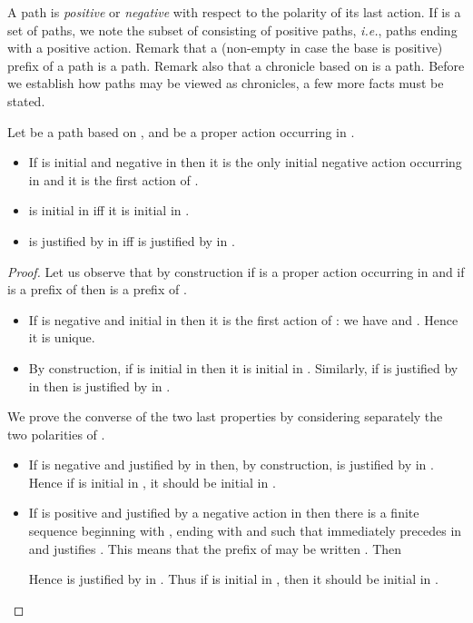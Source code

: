 \documentclass{LMCS}
\def\ie{{\em i.e.}}
\begin{document}
 

A path is {\em positive} or {\em negative} with respect to the polarity of its last action. If  is a set of paths, we note  the subset of  consisting of positive paths, \ie, paths ending with a positive action.
Remark that a (non-empty in case the base is positive) prefix of a path is a path.
Remark also that a chronicle based on  is a path.
Before we establish how paths may be viewed as chronicles, a few more facts must be stated.

 \begin{lem}\label{projection}
Let  be a path based on , and  be a proper action occurring in . 
  \begin{itemize}
  \item If  is initial and negative in  then it is the only initial negative action occurring in  and it is the first action of .
  \item  is initial in   iff it is  initial in .
  \item  is justified by  in  iff   is justified by  in .
  \end{itemize}
 \end{lem}

\begin{proof}
Let us observe that by construction if  is a proper action occurring in  and if  is a prefix of  then  is a prefix of .
\begin{itemize}
\item If   is negative and initial in  then it is the first action of : we have  and . Hence it is unique.
\item By construction, if  is initial in  then it is initial in . 
Similarly, if  is justified by  in  then   is justified by  in .
\end{itemize}
We prove the converse of the two last properties by considering separately the two polarities of .
\begin{itemize}
\item If  is negative and justified  by  in  then, by construction,  is justified by  in . Hence if  is initial in , it should be initial in .
\item If  is positive and justified by a negative action  in  then there is a finite sequence 
   beginning with , ending with  and such that  immediately precedes  in  and  justifies . This means that the prefix  of   may be written 
 . Then 

 Hence  is justified by  in .
 Thus if  is initial in , then it should be initial in .
\end{itemize}
  \end{proof}
\end{document}
